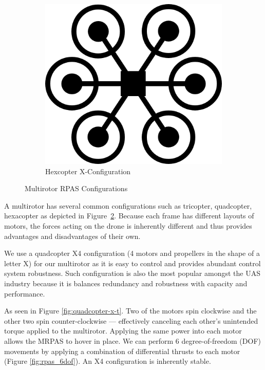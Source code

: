 \begin{figure}[b]
\begin{subfigure}[b]{0.3\textwidth}
		\includegraphics[scale=0.4]{img/drone_hexconfig}
		\caption{Hexcopter X-Configuration}
		\label{fig:hexcopter-x}
	\end{subfigure}
	
	\caption{Multirotor RPAS Configurations}
	\label{fig:rpas-config}
\end{figure}


A multirotor has several common configurations such as tricopter, quadcopter, hexacopter as depicted in Figure~\ref{fig:rpas-config}. Because each frame has different layouts of motors, the forces acting on the drone is inherently different and thus provides advantages and disadvantages of their own.

We use a quadcopter X4 configuration (4 motors and propellers in the shape of a letter X) for our multirotor as it is easy to control and provides abundant control system robustness. Such configuration is also the most popular amongst the UAS industry because it is balances redundancy and robustness with capacity and performance.

As seen in Figure \ref{fig:quadcopter-x-t}. Two of the motors spin clockwise and the other two spin counter-clockwise --- effectively canceling each other's unintended torque applied to the multirotor. Applying the same power into each motor allows the MRPAS to hover in place. We can perform 6 degree-of-freedom (DOF) movements by applying a combination of differential thrusts to each motor (Figure \ref{fig:rpas_6dof}). An X4 configuration is inherently stable.

